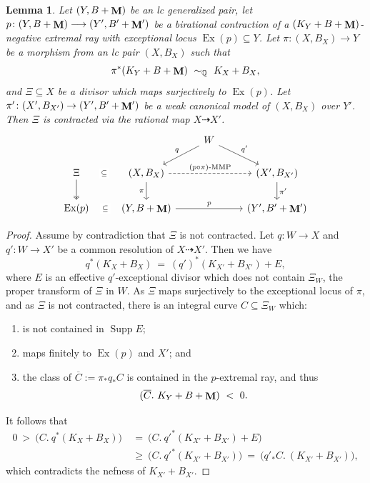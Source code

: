 \documentclass[a4paper,12pt]{amsart}
\newcommand{\ove}[1]{\overline{#1}}
\DeclareMathOperator{\Supp}{Supp}
\newcommand{\bQ}{{\mathbb Q}}
\DeclareMathOperator{\Exc}{Ex}
\DeclareMathOperator{\bfM}{{\bf{M}}}
\newtheorem{lemma}[theorem]{Lemma}
\theoremstyle{definition}
\theoremstyle{remark}
\begin{document}
\begin{lemma}\label{lemma_ext_contraction_downstairs_induces_one_upstairs}
    Let $(Y,B+\bfM)$ be an lc generalized pair, let $p\colon(Y,B+\bfM) \longrightarrow (Y',B'+\bfM')$ be a birational contraction of a $(K_Y+B+\bfM)$-negative extremal ray with exceptional locus $\Exc(p)\subseteq Y$. Let $\pi\colon(X,B_X)\to Y$ be a morphism from an lc pair $(X,B_X)$ such that $$\pi^*(K_Y+B+\bfM) \ \sim_{\bQ}\ K_X + B_X,$$ and $\Xi\subseteq X$ be a divisor which maps surjectively to $\operatorname{Ex}(p)$.
    Let $\pi'\colon (X',B_{X'})\to (Y',B'+\bfM')$ be a weak canonical model of $(X,B_X)$ over $Y'$. Then $\Xi$ is contracted via the rational map $X\dashrightarrow X'$.
\[\begin{tikzcd}
	&& W \\
	\Xi & {(X,B_X)} && {(X',B_{X'})} \\
	{\Exc(p)} & {(Y,B+\bfM)} && {(Y',B'+\bfM')}
	\arrow["q"', from=1-3, to=2-2]
	\arrow["{q'}", from=1-3, to=2-4]
	\arrow["\subseteq"{description}, draw=none, from=2-1, to=2-2]
	\arrow[two heads, from=2-1, to=3-1]
	\arrow["{(p\circ \pi)\textup{-MMP}}", dashed, from=2-2, to=2-4]
	\arrow["\pi"', from=2-2, to=3-2]
	\arrow["{\pi'}", from=2-4, to=3-4]
	\arrow["\subseteq"{description}, draw=none, from=3-1, to=3-2]
	\arrow["p", from=3-2, to=3-4]
\end{tikzcd}\]
\end{lemma}

\begin{proof}
Assume by contradiction that $\Xi$ is not contracted. Let $q\colon W\to X$ and $q'\colon W\to X'$ be a common resolution of $X\dashrightarrow X'$. Then we have 
\[q^*(K_X+B_X)\ =\ (q')^*(K_{X'} + B_{X'} ) + E,\] where
$E$ is an effective $q'$-exceptional divisor which does not contain $\Xi_W$, the proper transform of $\Xi$ in $W$.
As $\Xi$ maps surjectively to the exceptional locus of $\pi$, and as $\Xi $ is not contracted, there is an integral curve $C\subseteq \Xi_W$ which:
\begin{enumerate}
    \item is not contained in $\Supp E$;
    \item maps finitely to $\operatorname{Ex}(p)$ and $X'$; and
    \item the class of $\ove{C}:=\pi_*q_*C$ is contained in the $p$-extremal ray, and thus $$(\ove{C}. \ K_Y+B+\bfM)\ <\  0.$$
\end{enumerate}
It follows that \begin{equation}\nonumber
\begin{split}
    0\ >\ \big(C.\ q^*(K_X+B_X)\big) \ & =\  \big(C.\ q'^*(K_{X'} + B_{X'} ) + E\big)\\ 
    & \ge \ \big(C.\ q'^*(K_{X'} + B_{X'})\big)\  =\  \big(q'_*C.\ (K_{X'} + B_{X'})\big),
\end{split}
\end{equation}
which contradicts the nefness of $K_{X'}+B_{X'}$.
\end{proof}
\end{document}
